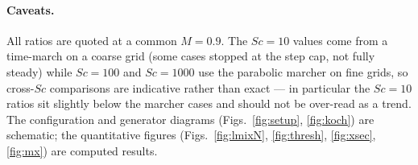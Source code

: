\documentclass[11pt]{article}
\newcommand{\Sc}{\mathit{Sc}}
\begin{document}
\paragraph{Caveats.} All ratios are quoted at a common $M=0.9$. The
$\Sc=10$ values come from a time-march on a coarse grid (some cases
stopped at the step cap, not fully steady) while $\Sc=100$ and $\Sc=1000$
use the parabolic marcher on fine grids, so cross-$\Sc$ comparisons are
indicative rather than exact --- in particular the $\Sc=10$ ratios sit
slightly below the marcher cases and should not be over-read as a trend.
The configuration and generator diagrams (Figs.~\ref{fig:setup},
\ref{fig:koch}) are schematic; the quantitative figures
(Figs.~\ref{fig:lmixN}, \ref{fig:thresh}, \ref{fig:xsec}, \ref{fig:mx})
are computed results.
\end{document}
